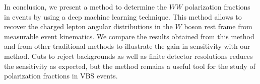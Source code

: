 In conclusion, we present a method to determine the $WW$ polarization fractions in
\ssWW events by using a deep machine learning technique.  This method
allows to recover the charged lepton angular distributions in the $W$
boson rest frame from measurable event kinematics.  We compare the
results obtained from this method and from other traditional methods
to illustrate the gain in sensitivity with our method.  Cuts to reject
backgrounds as well as finite detector resolutions reduces the sensitivity as
expected, but the method remains a useful tool for the study of
polarization fractions in VBS events.

\begin{thebibliography}{99}

\end{thebibliography}

